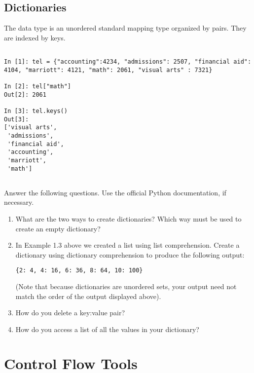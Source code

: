 \subsection*{Dictionaries}
\begin{example}

The  data type is an unordered standard mapping type 
organized by  pairs. They are indexed by keys. 

\begin{lstlisting}

In [1]: tel = {"accounting":4234, "admissions": 2507, "financial aid": 4104, "marriott": 4121, "math": 2061, "visual arts" : 7321} 

In [2]: tel["math"]
Out[2]: 2061

In [3]: tel.keys()
Out[3]: 
['visual arts',
 'admissions',
 'financial aid',
 'accounting',
 'marriott',
 'math']
 
\end{lstlisting}
\end{example}

\begin{problem}
Answer the following questions. Use the official Python documentation, if necessary.
\begin{enumerate}
\item What are the two ways to create dictionaries? Which way must be used to
create an empty dictionary?
\item In Example 1.3 above we created a list using list comprehension. Create a dictionary using dictionary comprehension to produce the following output:

\begin{lstlisting}
{2: 4, 4: 16, 6: 36, 8: 64, 10: 100}
\end{lstlisting}

(Note that because dictionaries are unordered sets, your output need not match the 
order of the output displayed above).
\item How do you delete a key:value pair?
\item How do you access a list of all the values in your dictionary? 

\end{enumerate}
\end{problem}


\section*{Control Flow Tools}

